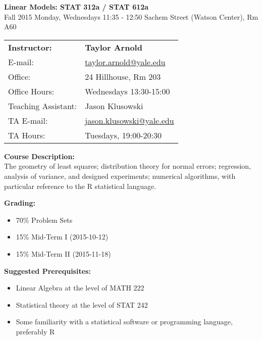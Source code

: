 \documentclass[12pt]{article}
\begin{document}
\begin{center}
{\bf Linear Models: STAT 312a / STAT 612a} \\
Fall 2015 \quad Monday, Wednesdays 11:35 - 12:50  Sachem Street (Watson Center), Rm A60
\end{center}

\bigskip

\noindent
\begin{tabular}{ l l }
{\bf Instructor:} &  {\bf Taylor Arnold} \\
E-mail: & \href{mailto:taylor.arnold@yale.edu}{taylor.arnold@yale.edu} \\
Office: & 24 Hillhouse, Rm 203 \\
Office Hours: & Wednesdays 13:30-15:00 \\
Teaching Assistant: & Jason Klusowski \\
TA E-mail: & \href{mailto:jason.klusowski@yale.edu}{jason.klusowski@yale.edu} \\
TA Hours: & Tuesdays, 19:00-20:30
\end{tabular}

\vspace{1cm}

{\bf Course Description:} \\
The geometry of least squares; distribution theory for normal errors; regression, analysis of variance, and designed experiments; numerical algorithms, with particular reference to the R statistical language.

\vspace{0.5cm}

{\bf Grading:}
\begin{itemize}\setlength\itemsep{0em}
\item 70\% Problem Sets
\item 15\% Mid-Term I (2015-10-12)
\item 15\% Mid-Term II (2015-11-18)
\end{itemize}

\vspace{0.5cm}

{\bf Suggested Prerequisites:}
\begin{itemize}\setlength\itemsep{0em}
\item Linear Algebra at the level of MATH 222
\item Statistical theory at the level of STAT 242
\item Some familiarity with a statistical software or programming language, preferably R
\end{itemize}
\end{document}
